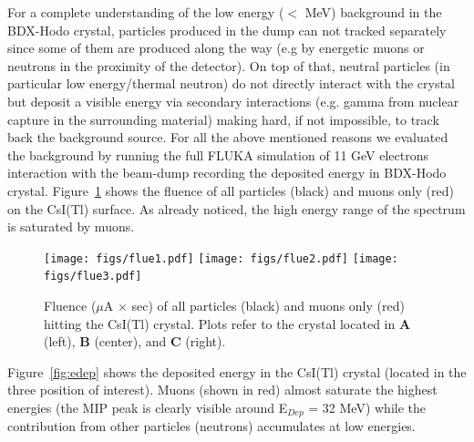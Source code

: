 For a complete understanding of the low energy ($<$ MeV) background in the BDX-Hodo crystal, particles produced in the dump can not tracked separately since some of them are produced along the way (e.g by energetic muons or neutrons in the proximity of the detector). On top of that, neutral particles (in particular low energy/thermal neutron) do not directly interact with the crystal but deposit a visible energy via secondary interactions (e.g. gamma from nuclear capture in the surrounding material) making hard, if not impossible,  to track back the background source. For all the above mentioned reasons we evaluated the background by running the  full FLUKA simulation of  11 GeV electrons interaction with the beam-dump recording  the deposited energy in BDX-Hodo crystal. 
Figure~\ref{fig:fluence-mAs} shows the fluence of all particles (black) and muons only (red) on the CsI(Tl) surface. As already noticed, the high energy range of the spectrum is saturated by muons. 
\begin{figure}[h!] 
\center
\texttt{[image: figs/flue1.pdf]}
\texttt{[image: figs/flue2.pdf]}
\texttt{[image: figs/flue3.pdf]}
\caption {Fluence ($\mu$A $\times$ sec)  of all particles (black) and muons only (red) hitting the CsI(Tl) crystal.
Plots refer to the crystal located in {\bf A} (left),  {\bf B} (center), and {\bf C} (right).}
\label{fig:fluence-mAs}
\end{figure}

Figure~\ref{fig:edep} shows the deposited energy in the CsI(Tl) crystal (located in the three  position of interest).  Muons (shown in red) almost saturate the highest energies (the MIP peak is clearly visible around E$_{Dep}$ = 32 MeV) while the contribution from other particles (neutrons) accumulates at low energies.

